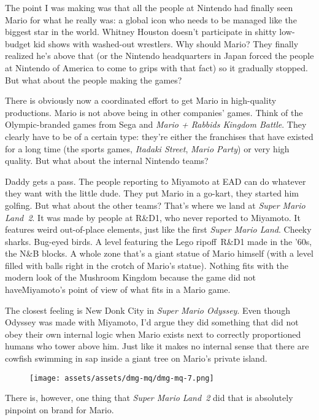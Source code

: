 \documentclass{book}
\begin{document}
The point I was making was that all the people at Nintendo had finally seen Mario for what he really was: a global icon who needs to be managed like the biggest star in the world. Whitney Houston doesn’t participate in shitty low-budget kid shows with washed-out wrestlers. Why should Mario? They finally realized he’s above that (or the Nintendo headquarters in Japan forced the people at Nintendo of America to come to grips with that fact) so it gradually stopped. But what about the people making the games?

There is obviously now a coordinated effort to get Mario in high-quality productions. Mario is not above being in other companies’ games. Think of the Olympic-branded games from Sega and \emph{Mario + Rabbids Kingdom Battle}. They clearly have to be of a certain type: they’re either the franchises that have existed for a long time (the sports games, \emph{Itadaki Street}, \emph{Mario Party}) or very high quality. But what about the internal Nintendo teams?

Daddy gets a pass. The people reporting to Miyamoto at EAD can do whatever they want with the little dude. They put Mario in a go-kart, they started him golfing. But what about the other teams? That’s where we land at \emph{Super Mario Land 2}. It was made by people at R\&D1, who never reported to Miyamoto. It features weird out-of-place elements, just like the first \emph{Super Mario Land}. Cheeky sharks. Bug-eyed birds. A level featuring the Lego ripoff R\&D1 made in the ’60s, the N\&B blocks. A whole zone that’s a giant statue of Mario himself (with a level filled with balls right in the crotch of Mario’s statue). Nothing fits with the modern look of the Mushroom Kingdom because the game did not haveMiyamoto’s point of view of what fits in a Mario game.

The closest feeling is New Donk City in \emph{Super Mario Odyssey}. Even though Odyssey was made with Miyamoto, I’d argue they did something that did not obey their own internal logic when Mario exists next to correctly proportioned humans who tower above him. Just like it makes no internal sense that there are cowfish swimming in sap inside a giant tree on Mario’s private island.

\begin{figure}[hbt]
\vskip 10pt
\centering \texttt{[image: assets/assets/dmg-mq/dmg-mq-7.png]}
\vskip 6pt
\end{figure}

There is, however, one thing that \emph{Super Mario Land 2} did that is absolutely pinpoint on brand for Mario.
\end{document}
